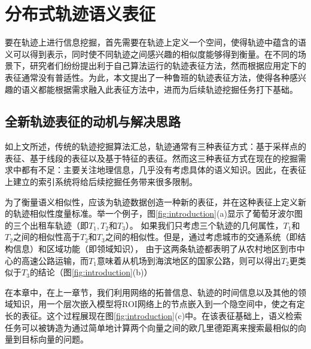 
\chapter{分布式轨迹语义表征}
\label{chapter:main2}

要在轨迹上进行信息挖掘，首先需要在轨迹上定义一个空间，使得轨迹中蕴含的语义可以得到表示，同时使不同轨迹之间感兴趣的相似度能够得到衡量。在不同的场景下，研究者们纷纷提出利于自己算法运行的轨迹表征方法，然而根据应用定下的表征通常没有普适性。为此，本文提出了一种鲁班的轨迹表征方法，使得各种感兴趣的语义都能根据需求融入此表征方法中，进而为后续轨迹挖掘任务打下基础。


\section{全新轨迹表征的动机与解决思路}
如上文所述，传统的轨迹挖掘算法汇总，轨迹通常有三种表征方式：基于采样点的表征、基于线段的表征以及基于特征的表征。然而这三种表征方式在现在的挖掘需求中都有不足：主要关注地理信息，几乎没有考虑具体的语义知识。因此，在表征上建立的索引系统将给后续挖掘任务带来很多限制。

为了衡量语义相似性，应该为轨迹数据创造一种新的表征，并在这种表征上定义新的轨迹相似性度量标准。举一个例子，图\ref{fig:introduction}(a)显示了葡萄牙波尔图的三个出租车轨迹（即$ T_1, T_2$和$T_3 $）。 如果我们只考虑三个轨迹的几何属性，$ T_1 $和$ T_2 $之间的相似性高于$ T_2 $和$ T_3 $之间的相似性。但是，通过考虑城市的交通系统（即结构信息）和区域功能（即领域知识）， 由于这两条轨迹都表明了从农村地区到市中心的高速公路运输，而$T_1$意味着从机场到海滨地区的国家公路，则可以得出$ T_2 $更类似于$ T_3 $的结论（图\ref{fig:introduction}(b)）

在本章中，在上一章节，我们利用网络的拓普信息、轨迹的时间信息以及其他的领域知识，用一个层次嵌入模型将ROI网络上的节点嵌入到一个隐空间中，使之有定长的表征。这个过程展现在图\ref{fig:introduction}(c)中。在该表征基础上，语义检索任务可以被铸造为通过简单地计算两个向量之间的欧几里德距离来搜索最相似的向量到目标向量的问题。

